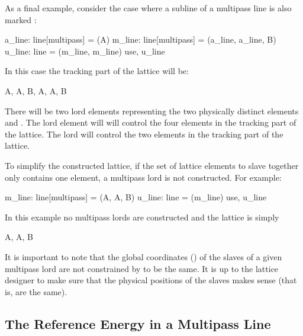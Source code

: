 As a final example, consider the case where a subline of a multipass line is also marked
:
\begin{example}
  a_line: line[multipass] = (A)
  m_line: line[multipass] = (a_line, a_line, B)
  u_line: line = (m_line, m_line)
  use, u_line
\end{example}
In this case the tracking part of the lattice will be:
\begin{example}
  A, A, B, A, A, B
\end{example}
There will be two lord elements representing the two physically distinct elements  and .
The  lord element will will control the four  elements in the tracking
part of the lattice. The  lord will control the two  elements in the tracking part
of the lattice. 

To simplify the constructed lattice, if the set of lattice elements to slave together only contains
one element, a multipass lord is not constructed. For example:
\begin{example}
  m_line: line[multipass] = (A, A, B)
  u_line: line = (m_line)
  use, u_line
\end{example}
In this example no multipass lords are constructed and the lattice is simply
\begin{example}
  A, A, B
\end{example}

It is important to note that the global coordinates () of the slaves of a given
multipass lord are not constrained by \bmad to be the same. It is up to the lattice designer to make
sure that the physical positions of the slaves makes sense (that is, are the same).

\subsection{The Reference Energy in a Multipass Line}
\label{s:ref.e.multi}

